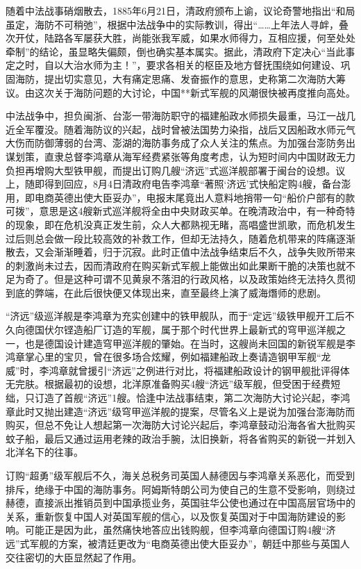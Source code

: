 \documentclass[12pt,UTF8]{ctexbook}
\begin{document}
随着中法战事硝烟散去，1885年6月21日，清政府颁布上谕，议论奇警地指出“和局虽定，海防不可稍弛”，根据中法战争中的实际教训，得出“……上年法人寻衅，叠次开仗，陆路各军屡获大胜，尚能张我军威，如果水师得力，互相应援，何至处处牵制”的结论，虽显略失偏颇，倒也确实基本属实。据此，清政府下定决心“当此事定之时，自以大治水师为主！”，要求各相关的枢臣及地方督抚围绕如何建设、巩固海防，提出切实意见，大有痛定思痛、发奋振作的意思，史称第二次海防大筹议。由这次关于海防问题的大讨论，中国**新式军舰的风潮很快被再度推向高处。

中法战争中，担负闽浙、台澎一带海防职守的福建船政水师损失最重，马江一战几近全军覆没。随着海防议的兴起，战时曾被法国势力染指，战后又因船政水师元气大伤而防御薄弱的台湾、澎湖的海防事务成了众人关注的焦点。为加强台澎防务出谋划策，直隶总督李鸿章从海军经费紧张等角度考虑，认为短时间内中国财政无力负担再增购大型铁甲舰，而提出订购几艘“济远”式巡洋舰部署于闽台的设想。议上，随即得到回应，8月4日清政府电告李鸿章“著照‘济远’式快船定购4艘，备台澎用，即电商英德出使大臣妥办”，电报末尾竟出人意料地捎带一句“船价户部有的款可拨”，意思是这4艘新式巡洋舰将全由中央财政买单。在晚清政治中，有一种奇特的现象，即在危机没真正发生前，众人大都熟视无睹，高唱盛世凯歌，而危机发生过后则总会做一段比较高效的补救工作，但却无法持久，随着危机带来的阵痛逐渐散去，又会渐渐睡着，归于沉寂。此时正值中法战争结束后不久，战争失败所带来的刺激尚未过去，因而清政府在购买新式军舰上能做出如此果断干脆的决策也就不足为奇了。但是这种可谓不见黄泉不落泪的行政风格，以及政策始终无法持久贯彻到底的弊端，在此后很快便又体现出来，直至最终上演了威海熸师的悲剧。

“济远”级巡洋舰是李鸿章为充实创建中的铁甲舰队，而于“定远”级铁甲舰开工后不久向德国伏尔铿造船厂订造的军舰，属于那个时代世界上最新式的穹甲巡洋舰之一，也是德国设计建造穹甲巡洋舰的肇始。在当时，这艘尚未回国的新锐军舰是李鸿章掌心里的宝贝，曾在很多场合炫耀，例如福建船政上奏请造钢甲军舰“龙威”时，李鸿章就曾援引“济远”之例进行对比，将福建船政设计的钢甲舰批评得体无完肤。根据最初的设想，北洋原准备购买4艘“济远”级军舰，但受困于经费短绌，只订造了首舰“济远”1艘。恰逢中法战事结束，第二次海防大讨论兴起，李鸿章此时又抛出建造“济远”级穹甲巡洋舰的提案，尽管名义上是说为加强台澎海防而购买，但总不免让人想起第一次海防大讨论兴起后，李鸿章鼓动沿海各省大批购买蚊子船，最后又通过运用老辣的政治手腕，汰旧换新，将各省购买的新锐一并划入北洋名下的往事。

订购“超勇”级军舰后不久，海关总税务司英国人赫德因与李鸿章关系恶化，而受到排斥，绝缘于中国的海防事务。阿姆斯特朗公司为使自己的生意不受影响，则绕过赫德，直接派出推销员到中国承揽业务，英国驻华公使也通过在中国高层官场中的关系，重新恢复中国人对英国军舰的信心，以及恢复英国对于中国海防建设的影响。可能正是因为此，虽然痛快地答应出钱购舰，但李鸿章向德国订购4艘“济远”式军舰的方案，被清廷更改为“电商英德出使大臣妥办”，朝廷中那些与英国人交往密切的大臣显然起了作用。
\end{document}
